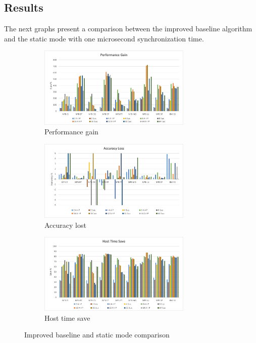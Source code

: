 \subsection{Results}

The next graphs present a comparison between the improved baseline algorithm and the static mode with one microsecond synchronization time. 

\begin{figure}[H]
    \centering
    \begin{subfigure}{\textwidth}
        \centering
        \includegraphics[width=0.8\textwidth]{Images/Performance_FINAL.png}
        \caption{ Performance gain}
        \label{fig:Performance_FINAL}
    \end{subfigure}
    \begin{subfigure}{\textwidth}
        \centering
        \includegraphics[width=0.8\textwidth]{Images/Accuracy_FINAL.png}
        \caption{ Accuracy lost}
        \label{fig:Accuracy_FINAL}
    \end{subfigure}
    \begin{subfigure}{\textwidth}
        \centering
        \includegraphics[width=0.8\textwidth]{Images/Host_FINAL.png}
        \caption{ Host time save}
        \label{fig:Host_FINAL}
    \end{subfigure}

\caption{Improved baseline and static mode comparison}
\label{fig:results_FINAL}
\end{figure}


